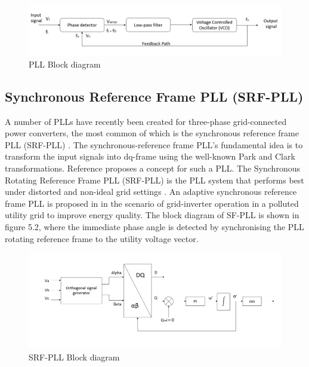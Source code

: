 \documentclass[a4paper,12pt]{iitmdiss}
\begin{document}
\begin{figure} 
    
    \includegraphics[width=1.0\textwidth]{PLL block diagram.png}
    \caption{PLL Block diagram}
\end{figure}



\subsection{Synchronous Reference Frame PLL (SRF-PLL)}

A number of PLLs have recently been created for three-phase grid-connected power converters, the most common of which is the synchronous reference frame PLL (SRF-PLL) \cite{golestan2012design}. The synchronous-reference frame PLL's fundamental idea is to transform the input signals into dq-frame using the well-known Park and Clark transformations. Reference \cite{golestan2012design} proposes a concept for such a PLL. The Synchronous Rotating Reference Frame PLL (SRF-PLL) is the PLL system that performs best under distorted and non-ideal grid settings \cite{ghoshal2007method}. An adaptive synchronous reference frame PLL is proposed in \cite{gonzalez2011adaptive} in the scenario of grid-inverter operation in a polluted utility grid to improve energy quality.
The block diagram of SF-PLL is shown in figure 5.2, where the immediate phase angle is detected by synchronising the PLL rotating reference frame to the utility voltage vector.

\begin{figure}[ht]
\centering
     \includegraphics[width=1.0\textwidth]{SRF PLL.png}
      \caption{SRF-PLL Block diagram}
       \label{SRF-PLL}
\end{figure}
\end{document}
